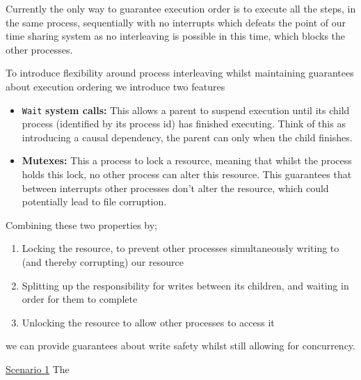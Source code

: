 \documentclass[logo,bsc,singlespacing,parskip]{infthesis}
\begin{document}
Currently the only way to guarantee execution order is to execute all the steps, in the same process, sequentially with no interrupts which defeats the point of our time sharing system as no interleaving is possible in this time, which blocks the other processes.

To introduce flexibility around process interleaving whilst maintaining guarantees about execution ordering we introduce two features

\begin{itemize}
    \item \lstinline{Wait} \textbf{system calls: } This allows a parent to suspend execution until its child process (identified by its process id) has finished executing. Think of this as introducing a causal dependency, the parent can only when the child finishes.
    \item \textbf{Mutexes: } This a process to lock a resource, meaning that whilst the process holds this lock, no other process can alter this resource. This guarantees that between interrupts other processes don't alter the resource, which could potentially lead to file corruption. 
\end{itemize}

Combining these two properties by;
\begin{enumerate}
    \item Locking the resource, to prevent other processes simultaneously writing to (and thereby corrupting) our resource
    \item Splitting up the responsibility for writes between its children, and waiting in order for them to complete
    \item Unlocking the resource to allow other processes to access it
\end{enumerate}

we can provide guarantees about write safety whilst still allowing for concurrency.
 

\underline{Scenario 1} 
The 
\end{document}
